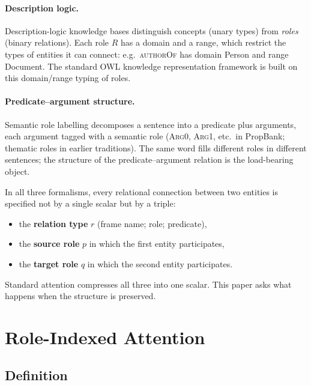 \documentclass{article}
\begin{document}
\paragraph{Description logic.}
Description-logic knowledge bases \citep{baader2003description}
distinguish concepts (unary types) from \emph{roles} (binary
relations). Each role $R$ has a domain and a range, which restrict
the types of entities it can connect: e.g.\ \textsc{authorOf} has
domain \textsf{Person} and range \textsf{Document}. The standard
OWL knowledge representation framework is built on this
domain/range typing of roles.

\paragraph{Predicate--argument structure.}
Semantic role labelling \citep{palmer2005propbank,
gildea2002automatic} decomposes a sentence into a predicate plus
arguments, each argument tagged with a semantic role
(\textsc{Arg0}, \textsc{Arg1}, etc.\ in PropBank; thematic roles
in earlier traditions). The same word fills different roles in
different sentences; the structure of the predicate--argument
relation is the load-bearing object.

In all three formalisms, every relational connection between two
entities is specified not by a single scalar but by a triple:
\begin{itemize}
    \item the \textbf{relation type} $r$ (frame name; role; predicate),
    \item the \textbf{source role} $p$ in which the first entity participates,
    \item the \textbf{target role} $q$ in which the second entity participates.
\end{itemize}
Standard attention compresses all three into one scalar. This paper
asks what happens when the structure is preserved.

\section{Role-Indexed Attention}
\label{sec:method}

\subsection{Definition}
\end{document}
